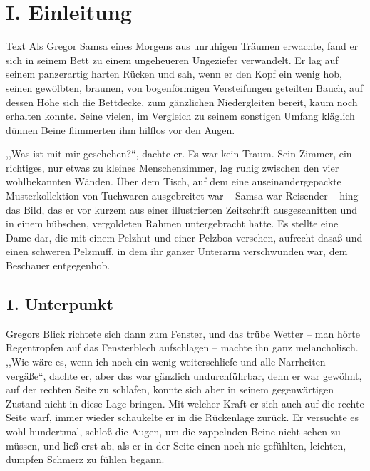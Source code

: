 \documentclass[]{zchinr}
\begin{document}

\zchinrprinttitle

\section{I. Einleitung}

Text Als Gregor Samsa eines Morgens aus unruhigen Träumen erwachte, fand er sich in seinem Bett zu einem ungeheueren Ungeziefer verwandelt. Er lag auf seinem panzerartig harten Rücken und sah, wenn er den Kopf ein wenig hob, seinen gewölbten, braunen, von bogenförmigen Versteifungen geteilten Bauch, auf dessen Höhe sich die Bettdecke, zum gänzlichen Niedergleiten bereit, kaum noch erhalten konnte. Seine vielen, im Vergleich zu seinem sonstigen Umfang kläglich dünnen Beine flimmerten ihm hilflos vor den Augen.

,,Was ist mit mir geschehen?``, dachte er. Es war kein Traum. Sein Zimmer, ein richtiges, nur etwas zu kleines Menschenzimmer, lag ruhig zwischen den vier wohlbekannten Wänden. Über dem Tisch, auf dem eine auseinandergepackte Musterkollektion von Tuchwaren ausgebreitet war -- Samsa war Reisender -- hing das Bild, das er vor kurzem aus einer illustrierten Zeitschrift ausgeschnitten und in einem hübschen, vergoldeten Rahmen untergebracht hatte. Es stellte eine Dame dar, die mit einem Pelzhut und einer Pelzboa versehen, aufrecht dasaß und einen schweren Pelzmuff, in dem ihr ganzer Unterarm verschwunden war, dem Beschauer entgegenhob.

\subsection{1. Unterpunkt}

Gregors Blick richtete sich dann zum Fenster, und das trübe Wetter -- man hörte Regentropfen auf das Fensterblech aufschlagen -- machte ihn ganz melancholisch. ,,Wie wäre es, wenn ich noch ein wenig weiterschliefe und alle Narrheiten vergäße``, dachte er, aber das war gänzlich undurchführbar, denn er war gewöhnt, auf der rechten Seite zu schlafen, konnte sich aber in seinem gegenwärtigen Zustand nicht in diese Lage bringen. Mit welcher Kraft er sich auch auf die rechte Seite warf, immer wieder schaukelte er in die Rückenlage zurück. Er versuchte es wohl hundertmal, schloß die Augen, um die zappelnden Beine nicht sehen zu müssen, und ließ erst ab, als er in der Seite einen noch nie gefühlten, leichten, dumpfen Schmerz zu fühlen begann.
\end{document}
